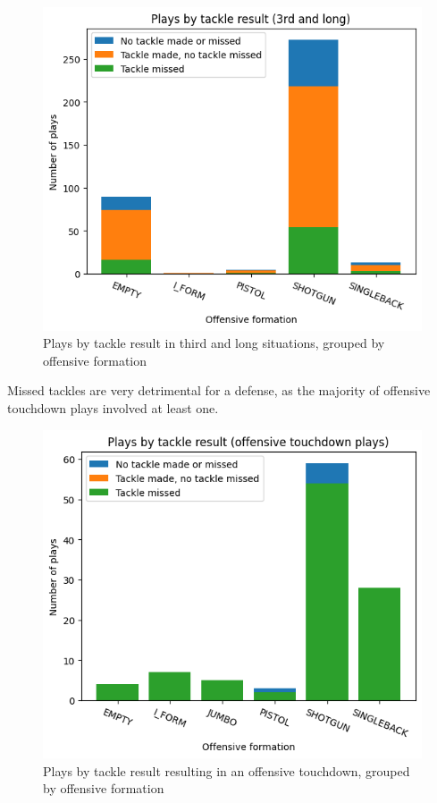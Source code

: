 \documentclass[bibtex, sigconf, hyperref={colorlinks=true,linkcolor=blue,urlcolor=blue}]{acmart}
\begin{document}
\begin{figure}[h]
  \centering
  \includegraphics[width=\linewidth]{plays-by-tackle-result-third-and-long.png}
  \caption{Plays by tackle result in third and long situations, grouped by
  offensive formation}
\end{figure}

Missed tackles are very detrimental for a defense, as the majority of offensive
touchdown plays involved at least one.

\begin{figure}[h]
  \centering
  \includegraphics[width=\linewidth]
  {plays-by-tackle-result-offensive-touchfown-plays.png}
  \caption{Plays by tackle result resulting in an offensive touchdown, grouped
  by offensive formation}
\end{figure}
\end{document}
